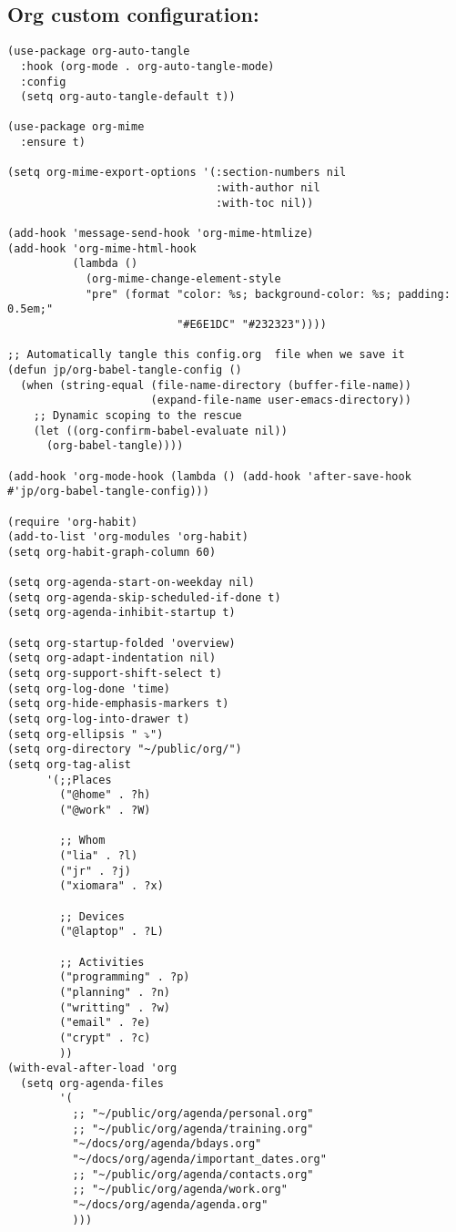 \documentclass[11pt]{article}
\begin{document}
\subsection{Org custom configuration:}
\label{sec:orgdc59bd3}
\begin{verbatim}
(use-package org-auto-tangle
  :hook (org-mode . org-auto-tangle-mode)
  :config
  (setq org-auto-tangle-default t))

(use-package org-mime
  :ensure t)

(setq org-mime-export-options '(:section-numbers nil
                                :with-author nil
                                :with-toc nil))

(add-hook 'message-send-hook 'org-mime-htmlize)
(add-hook 'org-mime-html-hook
          (lambda ()
            (org-mime-change-element-style
            "pre" (format "color: %s; background-color: %s; padding: 0.5em;"
                          "#E6E1DC" "#232323"))))

;; Automatically tangle this config.org  file when we save it
(defun jp/org-babel-tangle-config ()
  (when (string-equal (file-name-directory (buffer-file-name))
                      (expand-file-name user-emacs-directory))
    ;; Dynamic scoping to the rescue
    (let ((org-confirm-babel-evaluate nil))
      (org-babel-tangle))))

(add-hook 'org-mode-hook (lambda () (add-hook 'after-save-hook #'jp/org-babel-tangle-config)))

(require 'org-habit)
(add-to-list 'org-modules 'org-habit)
(setq org-habit-graph-column 60)

(setq org-agenda-start-on-weekday nil)
(setq org-agenda-skip-scheduled-if-done t)
(setq org-agenda-inhibit-startup t)

(setq org-startup-folded 'overview)
(setq org-adapt-indentation nil)
(setq org-support-shift-select t)
(setq org-log-done 'time)
(setq org-hide-emphasis-markers t)
(setq org-log-into-drawer t)
(setq org-ellipsis " ⤵")
(setq org-directory "~/public/org/")
(setq org-tag-alist
      '(;;Places
        ("@home" . ?h)
        ("@work" . ?W)

        ;; Whom
        ("lia" . ?l)
        ("jr" . ?j)
        ("xiomara" . ?x)

        ;; Devices
        ("@laptop" . ?L)

        ;; Activities
        ("programming" . ?p)
        ("planning" . ?n)
        ("writting" . ?w)
        ("email" . ?e)
        ("crypt" . ?c)
        ))
(with-eval-after-load 'org
  (setq org-agenda-files
        '(
          ;; "~/public/org/agenda/personal.org"
          ;; "~/public/org/agenda/training.org"
          "~/docs/org/agenda/bdays.org"
          "~/docs/org/agenda/important_dates.org"
          ;; "~/public/org/agenda/contacts.org"
          ;; "~/public/org/agenda/work.org"
          "~/docs/org/agenda/agenda.org"
          )))


\end{verbatim}
\end{document}
